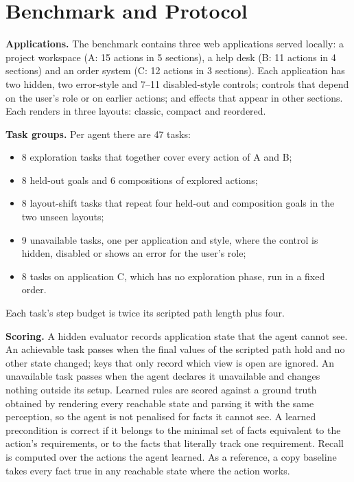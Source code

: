 \documentclass[conference]{IEEEtran}
\begin{document}
\section{Benchmark and Protocol}
\textbf{Applications.} The benchmark contains three web applications served locally: a project workspace (A: 15 actions in 5 sections), a help desk (B: 11 actions in 4 sections) and an order system (C: 12 actions in 3 sections). Each application has two hidden, two error-style and 7--11 disabled-style controls; controls that depend on the user's role or on earlier actions; and effects that appear in other sections. Each renders in three layouts: classic, compact and reordered.

\textbf{Task groups.} Per agent there are 47 tasks:
\begin{itemize}
\item 8 exploration tasks that together cover every action of A and B;
\item 8 held-out goals and 6 compositions of explored actions;
\item 8 layout-shift tasks that repeat four held-out and composition goals in the two unseen layouts;
\item 9 unavailable tasks, one per application and style, where the control is hidden, disabled or shows an error for the user's role;
\item 8 tasks on application C, which has no exploration phase, run in a fixed order.
\end{itemize}
Each task's step budget is twice its scripted path length plus four.

\textbf{Scoring.} A hidden evaluator records application state that the agent cannot see. An achievable task passes when the final values of the scripted path hold and no other state changed; keys that only record which view is open are ignored. An unavailable task passes when the agent declares it unavailable and changes nothing outside its setup. Learned rules are scored against a ground truth obtained by rendering every reachable state and parsing it with the same perception, so the agent is not penalised for facts it cannot see. A learned precondition is correct if it belongs to the minimal set of facts equivalent to the action's requirements, or to the facts that literally track one requirement. Recall is computed over the actions the agent learned. As a reference, a copy baseline takes every fact true in any reachable state where the action works.
\end{document}
